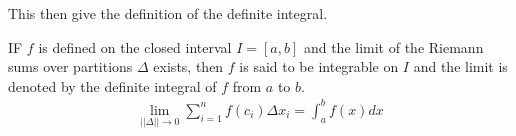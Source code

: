 This then give the definition of the definite integral.

\begin{defn}{1}
IF $f$ is defined on the closed interval $I=[a,b]$ and the limit of the Riemann sums over partitions $\Delta$ exists, then $f$ is said to be integrable on $I$ and the limit is denoted by the definite integral of $f$ from $a$ to $b$. 
\begin{align}
\lim_{||\Delta|| \to 0}\sum_{i=1}^{n}f(c_i)\Delta x_i = \int_a^b f(x)dx
\end{align}
\end{defn}

